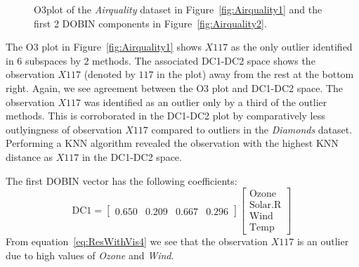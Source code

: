 \documentclass[letter,12pt]{article}
\begin{document}
\begin{figure}[!ht]
	\centering
	\hfill
	\caption{O3plot of the \textit{Airquality} dataset in Figure~\ref{fig:Airquality1} and the first 2 DOBIN components in Figure~\ref{fig:Airquality2}.}
	\label{fig:Airquality}
\end{figure}
The O3 plot in Figure~\ref{fig:Airquality1} shows $X117$ as the only outlier identified in $6$ subspaces by $2$ methods. The associated DC1-DC2 space shows the observation $X117$ (denoted by $117$ in the plot) away from the rest at the bottom right. Again, we see agreement between the O3 plot and DC1-DC2 space. The observation $X117$ was identified as an outlier only by a third of the outlier methods. This is corroborated in the DC1-DC2 plot by comparatively less outlyingness of observation $X117$ compared to outliers in the \textit{Diamonds} dataset. Performing a KNN algorithm revealed the observation with the highest KNN distance as $X117$ in the DC1-DC2 space.

The first DOBIN vector has the following coefficients:
{\color{blue}
\begin{equation}\label{eq:ResWithVis4}
	\text{DC1} = \begin{bmatrix}
	0.650 & 0.209 & 0.667 & 0.296
	\end{bmatrix}
	\begin{bmatrix}
		\text{Ozone}   \\
		\text{Solar.R} \\
		\text{Wind}    \\
		\text{Temp}
	\end{bmatrix} \,
\end{equation}}
From equation~\eqref{eq:ResWithVis4} we see that the observation $X117$ is an outlier due to high values of \textit{Ozone} and \textit{Wind}.
\end{document}
